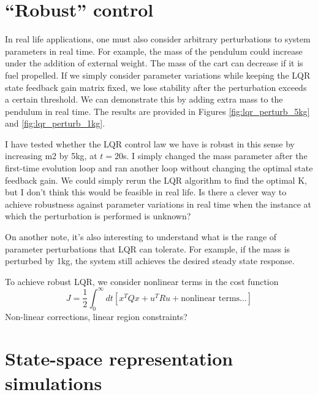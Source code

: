 \documentclass[12pt]{article}
\numberwithin{equation}{section}
\begin{document}
\section{``Robust'' control}
In real life applications, one must also consider arbitrary perturbations to system parameters in real time. For example, the mass of the pendulum could increase under the addition of external weight. The mass of the cart can decrease if it is fuel propelled. If we simply consider parameter variations while keeping the LQR state feedback gain matrix fixed, we lose stability after the perturbation exceeds a certain threshold. We can demonstrate this by adding extra mass to the pendulum in real time. The results are provided in Figures \ref{fig:lqr_perturb_5kg} and \ref{fig:lqr_perturb_1kg}.

I have tested whether the LQR control law we have is robust in this sense by increasing m2 by 5kg, at $t = 20$s. I simply changed the mass parameter after the first-time evolution loop and ran another loop without changing the optimal state feedback gain. We could simply rerun the LQR algorithm to find the optimal K, but I don't think this would be feasible in real life. Is there a clever way to achieve robustness against parameter variations in real time when the instance at which the perturbation is performed is unknown?

On another note, it's also interesting to understand what is the range of parameter perturbations that LQR can tolerate. For example, if the mass is perturbed by 1kg, the system still achieves the desired steady state response.

To achieve robust LQR, we consider nonlinear terms in the cost function
\begin{equation}
    J = \frac{1}{2} \int_{0}^{\infty}dt \left[x^T Q x + u^T R u + \text{nonlinear terms} \dots \right]
\end{equation}
Non-linear corrections, linear region constraints?

\newpage
\appendix

\section{State-space representation simulations}
\label{app:zero-input-sim}
\end{document}

